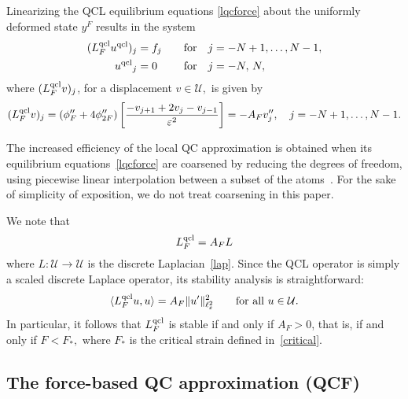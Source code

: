 \documentclass[12pt,reqno]{amsart}
\begin{document}
Linearizing the QCL equilibrium equations \eqref{lqcforce} about the
uniformly deformed state $y^F$ results in the system
\begin{equation*}
\begin{aligned}
({L^{{\rm qcl}}_F}{u^{{\rm qcl}}})_j&=f_j&\quad&\text{for} \quad j = -N+1, \dots, N-1,\\
{u^{{\rm qcl}}}_{j}&=0&\quad&\text{for} \quad j = -N,\,N,
\end{aligned}
\end{equation*}
where $({L^{{\rm qcl}}_F}{v})_j$, for a displacement ${v} \in
{\mathcal{U}},$ is given by
\begin{equation*}
({L^{{\rm qcl}}_F} {v})_j=
(\phi''_F + 4 \phi''_{2F})
	\left[\frac{-v_{j+1} + 2 v_{j} - v_{j-1}}{{\varepsilon}^2} \right]=-A_Fv_j'', \quad j=-N+1,\dots, N-1.
\end{equation*}

The increased efficiency of the local QC approximation is obtained
when its equilibrium equations~\eqref{lqcforce} are coarsened by
reducing the degrees of freedom, using piecewise linear interpolation
between a subset of the atoms~\cite{Dobson:2008a,Miller:2003a}.  For
the sake of simplicity of exposition, we do not treat coarsening in
this paper.

We note that
\begin{equation*}
{L^{{\rm qcl}}_F}=A_F{{L}}
\end{equation*}
where ${{L}}:{\mathcal{U}}\to{\mathcal{U}}$ is the discrete Laplacian~\eqref{lap}.
Since the QCL operator is simply a scaled discrete Laplace operator,
its stability analysis is straightforward:
\begin{displaymath}
  {\langle} {L^{{\rm qcl}}_F} u, u {\rangle} = A_F \|u'\|_{\ell^2_{\varepsilon}}^2 \qquad
  \text{for all } u \in {\mathcal{U}}.
\end{displaymath}
In particular, it follows that ${L^{{\rm qcl}}_F}$ is stable if and only if $A_F >
0$, that is, if and only if $F < F_*,$ where $F_*$ is the critical
strain defined in~\eqref{critical}.

\subsection{The force-based QC approximation (QCF)}
\end{document}
